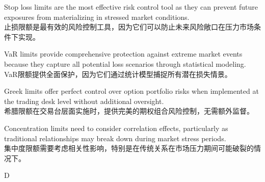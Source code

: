 \documentclass{article}
\begin{document}
    \begin{choices}
    \item Stop loss limits are the most effective risk control tool as they can prevent future exposures from materializing in stressed market conditions. \\
    止损限额是最有效的风险控制工具，因为它们可以防止未来风险敞口在压力市场条件下实现。
    
    \item VaR limits provide comprehensive protection against extreme market events because they capture all potential loss scenarios through statistical modeling. \\
    VaR限额提供全面保护，因为它们通过统计模型捕捉所有潜在损失情景。
    
    \item Greek limits offer perfect control over option portfolio risks when implemented at the trading desk level without additional oversight. \\
    希腊限额在交易台层面实施时，提供完美的期权组合风险控制，无需额外监督。
    
    \item Concentration limits need to consider correlation effects, particularly as traditional relationships may break down during market stress periods. \\  
    集中度限额需要考虑相关性影响，特别是在传统关系在市场压力期间可能破裂的情况下。
    \end{choices}
    
    \begin{correctanswer}
    D
    \end{correctanswer}
    
\end{document}
